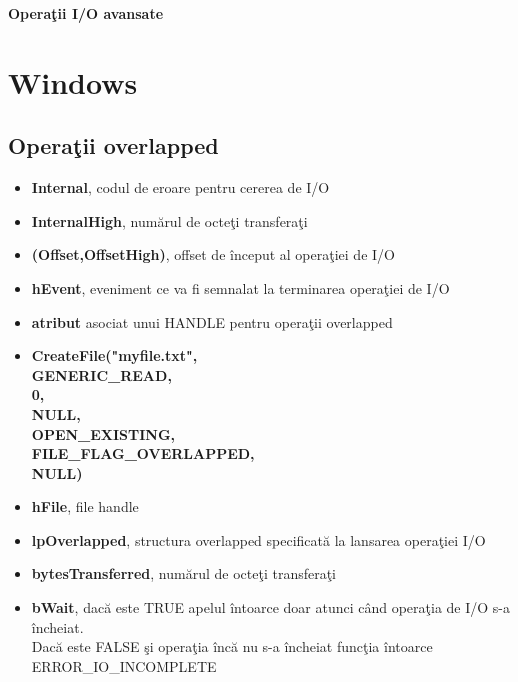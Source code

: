 \documentclass{refcard.cs.pub.ro}
\begin{document}
\raggedright
\footnotesize
\begin{multicols*}{3}

\setlength{\columnseprule}{0.25pt}
\setlength{\premulticols}{1pt}
\setlength{\postmulticols}{1pt}
\setlength{\multicolsep}{1pt}
\setlength{\columnsep}{2pt}

\begin{center}
     \Large{\textbf{Operaţii I/O avansate}} \\
\end{center}

\section{Windows}
\subsection{Operaţii overlapped}
\begin{itemize}
\item \textbf{Internal}, codul de eroare pentru cererea de I/O
\item \textbf{InternalHigh}, numărul de octeţi transferaţi
\item \textbf{(Offset,OffsetHigh)}, offset de început al operaţiei de I/O
\item \textbf{hEvent}, eveniment ce va fi semnalat la terminarea operaţiei de I/O
\end{itemize}
\begin{itemize}
\item \textbf{atribut} asociat unui HANDLE pentru operaţii overlapped
\item \textbf{CreateFile("myfile.txt", \\
                         GENERIC_READ, \\
                         0,\\ 
                         NULL,\\ 
                         OPEN_EXISTING,\\ 
                         FILE_FLAG_OVERLAPPED,\\
                         NULL)}
\end{itemize}
\begin{itemize}
\item \textbf{hFile}, file handle
\item \textbf{lpOverlapped}, structura overlapped specificată la lansarea operaţiei I/O
\item \textbf{bytesTransferred}, numărul de octeţi transferaţi
\item \textbf{bWait}, dacă este TRUE apelul întoarce doar atunci când operaţia de I/O s-a încheiat. \\Dacă 
este FALSE şi operaţia încă nu s-a încheiat funcţia întoarce ERROR_IO_INCOMPLETE
\end{itemize}

\end{multicols*}
\end{document}
